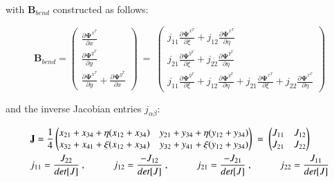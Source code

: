 with $\mathbf{B}_{bend}$ constructed as follows:

\begin{equation} 
\mathbf{B}_{bend} =
\begin{pmatrix}
\frac{\partial \mathbf{\Psi}^{x^T}}{\partial x} \\
\frac{\partial \mathbf{\Psi}^{y^T}}{\partial y} \\
\frac{\partial \mathbf{\Psi}^{x^T}}{\partial y} + \frac{\partial \mathbf{\Psi}^{y^T}}{\partial x}
\end{pmatrix}
\ =\ 
\begin{pmatrix}
j_{11} \frac{\partial \mathbf{\Psi}^{x^T}}{\partial \xi}  + j_{12} \frac{\partial \mathbf{\Psi}^{x^T}}{\partial \eta}  \\
j_{21} \frac{\partial \mathbf{\Psi}^{y^T}}{\partial \xi} + j_{22} \frac{\partial \mathbf{\Psi}^{y^T}}{\partial \eta} \\
j_{11} \frac{\partial \mathbf{\Psi}^{y^T}}{\partial \xi}  + j_{12} \frac{\partial \mathbf{\Psi}^{y^T}}{\partial \eta} + j_{21} \frac{\partial \mathbf{\Psi}^{x^T}}{\partial \xi} + j_{22} \frac{\partial \mathbf{\Psi}^{x^T}}{\partial \eta}
\end{pmatrix}
\label{equation28}
\end{equation}

and the inverse Jacobian entries $j_{\alpha \beta}$:

\begin{gather} 
	\begin{aligned}
		&\mathbf{J} = \frac{1}{4}
		\begin{pmatrix}
			x_{21} + x_{34} + \eta (x_{12} + x_{34}) & y_{21} + y_{34} + \eta (y_{12} + y_{34}) \\
			x_{32} + x_{41} + \xi (x_{12} + x_{34}) & y_{32} + y_{41} + \xi (y_{12} + y_{34})
		\end{pmatrix}
		\ = \ 
		\begin{pmatrix}
			J_{11} & J_{12} \\
			J_{21} & J_{22}
		\end{pmatrix} \\
		&j_{11} = \frac{J_{22}}{det[J]}\ ,
		\hspace{10mm}
		j_{12} = \frac{-J_{12}}{det[J]}\ ,
		\hspace{10mm}
		j_{21} = \frac{-J_{21}}{det[J]}\ ,
		\hspace{10mm}
		j_{22} = \frac{J_{11}}{det[J]}
		\label{equation29}
	\end{aligned}
\end{gather}

